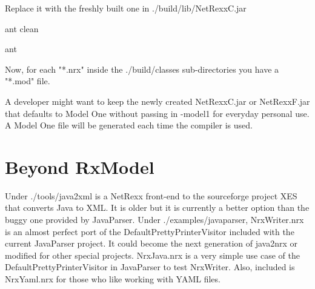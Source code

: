Replace it with the freshly built one in ./build/lib/NetRexxC.jar

ant clean

ant

Now, for each "*.nrx" inside the ./build/classes sub-directories you have a "*.mod" file.

A developer might want to keep the newly created NetRexxC.jar or NetRexxF.jar that defaults to Model One without passing in -model1 for everyday personal use. A Model One file will be generated each time the compiler is used.

\section{Beyond RxModel}

Under ./tools/java2xml is a NetRexx front-end to the sourceforge project XES that converts Java to XML. It is older but it is currently a better option than the buggy one provided by JavaParser. Under ./examples/javaparser, NrxWriter.nrx is an almost perfect port of the DefaultPrettyPrinterVisitor included with the current JavaParser project. It could become the next generation of java2nrx or modified for other special projects. NrxJava.nrx is a very simple use case of the DefaultPrettyPrinterVisitor in JavaParser to test NrxWriter. Also, included is NrxYaml.nrx for those who like working with YAML files.